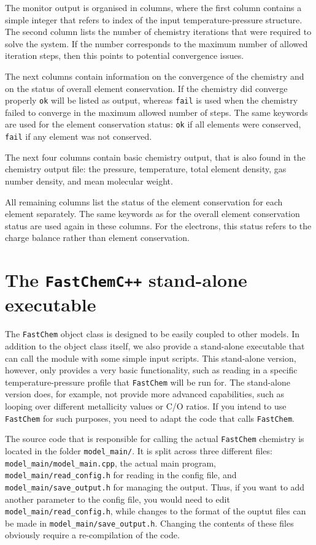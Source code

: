 \documentclass[numbers=noenddot]{fcmanual}
\newcommand{\fc}{\texttt{FastChem}\xspace}
\newcommand{\cpp}{\ttt{C++}\xspace}
\newcommand{\ttt}[1]{\texttt {#1}}
\begin{document}
The monitor output is organised in columns, where the first column contains a simple integer that refers to index of the input temperature-pressure structure. The second column lists the number of chemistry iterations that were required to solve the system. If the number corresponds to the maximum number of allowed iteration steps, then this points to potential convergence issues. 

The next columns contain information on the convergence of the chemistry and on the status of overall element conservation. If the chemistry did converge properly \verb|ok| will be listed as output, whereas \verb|fail| is used when the chemistry failed to converge in the maximum allowed number of steps. The same keywords are used for the element conservation status: \verb|ok| if all elements were conserved, \verb|fail| if any element was not conserved. 

The next four columns contain basic chemistry output, that is also found in the chemistry output file: the pressure, temperature, total element density, gas number density, and mean molecular weight.

All remaining columns list the status of the element conservation for each element separately. The same keywords as for the overall element conservation status are used again in these columns. For the electrons, this status refers to the charge balance rather than element conservation.




\chapter{The \fc \cpp stand-alone executable}

The \fc object class is designed to be easily coupled to other models. In addition to the object class itself, we also provide a stand-alone executable that can call the module with some simple input scripts. This stand-alone version, however, only provides a very basic functionality, such as reading in a specific temperature-pressure profile that \fc will be run for. The stand-alone version does, for example, not provide more advanced capabilities, such as looping over different metallicity values or C/O ratios. If you intend to use \fc for such purposes, you need to adapt the code that calls \fc.

The source code that is responsible for calling the actual \fc chemistry is located in the folder \verb|model_main/|. It is split across three different files: \verb|model_main/model_main.cpp|, the actual main program, \verb|model_main/read_config.h| for reading in the config file, and \verb|model_main/save_output.h| for managing the output. Thus, if you want to add another parameter to the config file, you would need to edit \verb|model_main/read_config.h|, while changes to the format of the ouptut files can be made in \verb|model_main/save_output.h|. Changing the contents of these files obviously require a re-compilation of the code.
\end{document}
